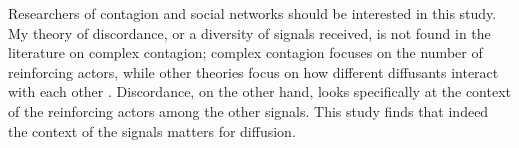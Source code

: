Researchers of contagion and social networks should be interested in this study.
My theory of discordance, or a diversity of signals received, is not found in
the literature on complex contagion; complex contagion focuses on the number of
reinforcing actors, while other theories focus on how different diffusants
interact with each other
\citep{houghton20,goldbergSocialContagionAssociative2018,mason_etal07}.
Discordance, on the other hand, looks specifically at the context of the
reinforcing actors among the other signals. This study finds that indeed the
context of the signals matters for diffusion.